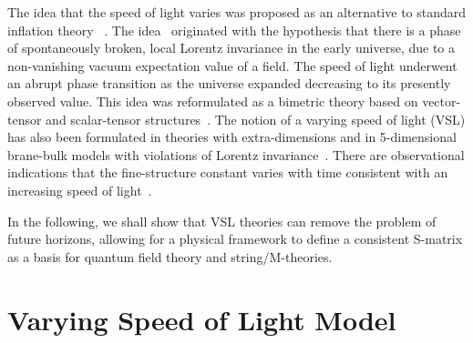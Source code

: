 \documentclass[a4paper,12pt]{article}
\begin{document}
The idea that the speed of light varies was proposed as an alternative to
standard inflation theory
~\cite{Moffat,Moffat2,Albrecht,Barrow,Barrow2,Brandenberger,
Avelino,Hark,Magueijo,Clayton,Drummond,Liberati,Kiritsis}.
The idea~\cite{Moffat} originated with the hypothesis that there
is a phase of spontaneously broken, local Lorentz invariance in the early
universe, due to a non-vanishing vacuum expectation value of a field. The
speed of light underwent an abrupt phase transition as the universe
expanded decreasing to its presently observed value. This idea was
reformulated as a bimetric theory based on vector-tensor and scalar-tensor
structures~\cite{Clayton,Drummond,Liberati}. The notion of a varying speed
of light (VSL) has also been formulated in theories with extra-dimensions
and in 5-dimensional brane-bulk models with violations of Lorentz
invariance~\cite{Kiritsis}. There are observational indications that the
fine-structure constant \coordHE{} varies with time consistent
with an increasing speed of light~\cite{Webb}.

In the following, we shall show that VSL theories can remove the problem of
future horizons, allowing for a physical framework to define a consistent
S-matrix as a basis for quantum field theory and string/M-theories.

\section{\bf Varying Speed of Light Model}
\end{document}
